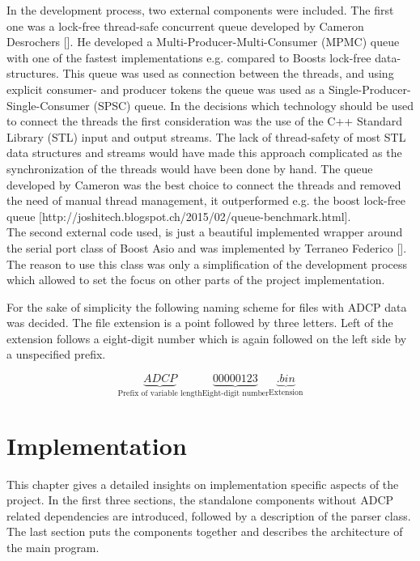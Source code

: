 In the development process, two external components were included. The first one was a lock-free thread-safe concurrent queue developed by Cameron Desrochers []. He developed a Multi-Producer-Multi-Consumer (MPMC) queue with one of the fastest implementations e.g. compared to Boosts lock-free data-structures. This queue was used as connection between the threads, and using explicit consumer- and producer tokens the queue was used as a Single-Producer-Single-Consumer (SPSC) queue. In the decisions which technology should be used to connect the threads the first consideration was the use of the C++ Standard Library (STL)  input and output streams. The lack of thread-safety of most STL data structures and streams would have made this approach complicated as the synchronization of the threads would have been done by hand. The queue developed by Cameron was the best choice to connect the threads and removed the need of manual thread management, it outperformed e.g. the boost lock-free queue [http://joshitech.blogspot.ch/2015/02/queue-benchmark.html].\\
The second external code used, is just a beautiful implemented wrapper around the serial port class of Boost Asio and was implemented by Terraneo Federico []. The reason to use this class was only a simplification of the development process which allowed to set the focus on other parts of the project implementation.

For the sake of simplicity the following naming scheme for files with ADCP data was decided. The file extension is a point followed by three letters. Left of the extension follows a  eight-digit number which is again followed on the left side by a unspecified prefix.

$$ \underbrace{ADCP}_{\text{Prefix of variable length}}\underbrace{00000123}_{\text{Eight-digit number}}\underbrace{.bin}_{\text{Extension}}$$

\chapter{Implementation}
This chapter gives a detailed insights on implementation specific aspects of the project. In the first three sections, the standalone components without ADCP related dependencies  are introduced, followed by a description of the parser class. The last section puts the components together and describes the architecture of the main program.  
